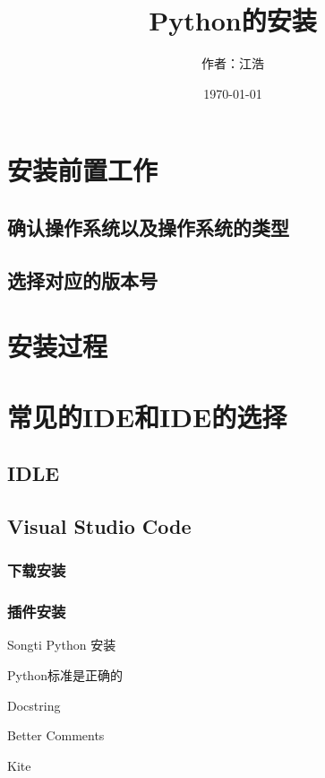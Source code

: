 \documentclass[UTF8]{ctexart} %
\title{Python的安装}
\author{作者：江浩}
\date{\today}
\begin{document}
\maketitle
\tableofcontents
	
    \section{安装前置工作}
        \subsection{确认操作系统以及操作系统的类型}

		\subsection{选择对应的版本号}
    \section{安装过程}
    \section{常见的IDE和IDE的选择}
        \subsection{IDLE}
        \subsection{Visual Studio Code}
            \subsubsection{下载安装}
			\subsubsection{插件安装}
	\textrm{Songti}
			Python
			安装

			Python标准是正确的

			Docstring
			
			Better Comments
			
			Kite
\end{document}
